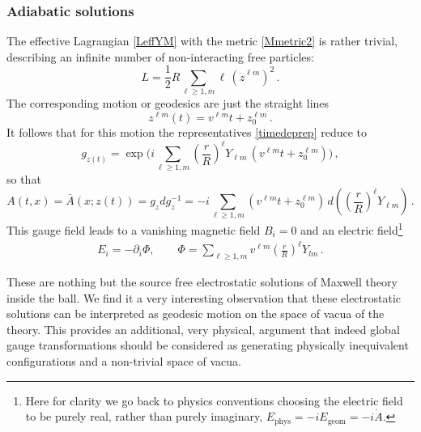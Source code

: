 \documentclass[11pt,a4paper]{article}
\def\pd{\partial}
\begin{document}
	        \subsubsection{Adiabatic solutions}          
          	The effective Lagrangian \eqref{LeffYM} with the metric \eqref{Mmetric2} is rather trivial, describing an infinite number of non-interacting free particles:
          	\begin{equation}
          	L=\frac{1}{2}R\sum_{\ell\geq 1, m}\!\ell\, (\dot z^{\ell m})^2\,.
          	\end{equation}
          	The corresponding motion or geodesics are just the straight lines 
          	\begin{equation}
          	z^{\ell m}(t)=v^{\ell m}t+z_0^{\ell m}\,.
          	\end{equation}
           It follows that for this motion the representatives \eqref{timedeprep} reduce to
           \begin{equation}
           g_{z(t)}=\exp\Big(i\sum_{\ell\geq 1, m}\left(\frac{r}{R}\right)^\ell Y_{\ell m}\,(v^{\ell m}t+z_0^{\ell m})\Big)\,,
           \end{equation}
           so that
           \begin{equation}
           A(t,x)=\bar A(x;z(t))=g_{z}dg_z^{-1}=-i\sum_{\ell\geq 1, m}(v^{\ell m}t+z_0^{\ell m})\,d\left(\left(\frac{r}{R}\right)^\ell Y_{\ell m}\right)\,.
           \end{equation}
           This gauge field leads to a vanishing magnetic field $B_i=0$ and an electric field\footnote{Here for clarity we go back to physics conventions choosing the electric field to be purely real, rather than purely imaginary, $E_{\mathrm{phys}}=-i E_\mathrm{geom}=-i\dot A$.}
          	\begin{align}
          	E_i=-\pd_i\Phi, \qquad \Phi=\sum_{\ell\geq 1, m}v^{\ell m}\left(\frac{r}{R}\right)^\ell Y_{lm}\label{Efields}  \,.
          	\end{align}
          	
          	These are nothing but the source free electrostatic solutions of Maxwell theory inside the ball. We find it a very interesting observation that these electrostatic solutions can be interpreted as geodesic motion on the space of vacua of the theory. This provides an additional, very physical, argument that indeed global gauge transformations should be considered as generating physically inequivalent configurations and a non-trivial space of vacua.
          	
\end{document}
